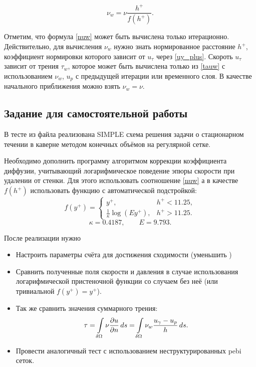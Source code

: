 \begin{equation}
\label{nuw}
\nu_w = \nu\frac{h^{+}}{f(h^{+})}.
\end{equation}

Отметим, что формула \cref{nuw} может быть вычислена только итерационно.
Действительно, для вычисления $\nu_w$ нужно знать нормированное расстояние $h^{+}$, коэффициент нормировки которого зависит от $u_\tau$ через \cref{uy_plus}.
Скороть $u_\tau$ зависит от трения $\tau_w$, которое может быть вычислена только из \cref{tauw} с использованием $\nu_w$, $u_p$ с предыдущей итерации или временного слоя.
В качестве начального приближения можно взять $\nu_w = \nu$.

\subsection{Задание для самостоятельной работы}
В тесте  из файла 
реализована SIMPLE схема решения задачи о стационарном течении в каверне
методом конечных объёмов на регулярной сетке.

Необходимо дополнить программу алгоритмом коррекции коэффициента диффузии,
учитывающий логарифмическое поведение эпюры скорости при удалении от стенки.
Для этого использовать соотношение \cref{nuw} а в качестве $f(h^{+})$
использовать функцию с автоматической подстройкой:
\begin{equation*}
f(y^{+}) = \begin{cases}
y^{+},                         & h^{+} < 11.25,\\
\frac{1}{\kappa}\log(E y^{+}), & h^{+} > 11.25.
\end{cases}
\end{equation*}
\begin{equation*}
\kappa = 0.4187, \qquad E = 9.793.
\end{equation*}

После реализации нужно
\begin{itemize}
\item Настроить параметры счёта для достижения сходимости (уменьшить )
\item Сравнить полученные поля скорости и давления в случае использования логарифмической пристеночной функции со случаем без неё (или тривиальной $f(y^{+}) = y^{+}$).
\item Так же сравнить значения суммарного трения: 
\begin{equation*}
   \tau = \int\limits_{\delta\Omega} \nu \frac{\partial u}{\partial n} \, ds = \int\limits_{\delta\Omega} \nu_w \frac{u_\gamma - u_p}{h}\, ds.
\end{equation*}
\item Провести аналогичный тест с использованием неструктурированных pebi сеток.
\end{itemize}

